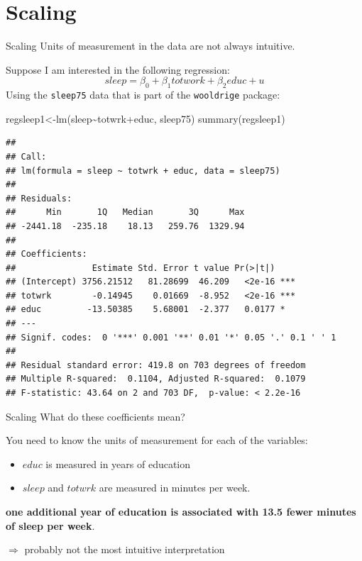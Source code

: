 \documentclass[
  ignorenonframetext,
]{beamer}
\newenvironment{Shaded}{\begin{snugshade}}{\end{snugshade}}
\newcommand{\FunctionTok}[1]{\textcolor[rgb]{0.00,0.00,0.00}{#1}}
\newcommand{\NormalTok}[1]{#1}
\newcommand{\OtherTok}[1]{\textcolor[rgb]{0.56,0.35,0.01}{#1}}
\newcommand{\SpecialCharTok}[1]{\textcolor[rgb]{0.00,0.00,0.00}{#1}}
\begin{document}
\hypertarget{scaling}{%
\section{Scaling}\label{scaling}}

\begin{frame}[fragile]{Scaling}
\protect\hypertarget{scaling-1}{}
Units of measurement in the data are not always intuitive.

Suppose I am interested in the following regression: \[
sleep=\beta_0+\beta_1totwork+\beta_2educ+u
\] Using the \texttt{sleep75} data that is part of the
\texttt{wooldrige} package:

\tiny

\begin{Shaded}
\begin{Highlighting}[]
\NormalTok{regsleep1}\OtherTok{\textless{}{-}}\FunctionTok{lm}\NormalTok{(sleep}\SpecialCharTok{\textasciitilde{}}\NormalTok{totwrk}\SpecialCharTok{+}\NormalTok{educ, sleep75)}
\FunctionTok{summary}\NormalTok{(regsleep1)}
\end{Highlighting}
\end{Shaded}

\begin{verbatim}
## 
## Call:
## lm(formula = sleep ~ totwrk + educ, data = sleep75)
## 
## Residuals:
##      Min       1Q   Median       3Q      Max 
## -2441.18  -235.18    18.13   259.76  1329.94 
## 
## Coefficients:
##               Estimate Std. Error t value Pr(>|t|)    
## (Intercept) 3756.21512   81.28699  46.209   <2e-16 ***
## totwrk        -0.14945    0.01669  -8.952   <2e-16 ***
## educ         -13.50385    5.68001  -2.377   0.0177 *  
## ---
## Signif. codes:  0 '***' 0.001 '**' 0.01 '*' 0.05 '.' 0.1 ' ' 1
## 
## Residual standard error: 419.8 on 703 degrees of freedom
## Multiple R-squared:  0.1104, Adjusted R-squared:  0.1079 
## F-statistic: 43.64 on 2 and 703 DF,  p-value: < 2.2e-16
\end{verbatim}
\end{frame}

\begin{frame}{Scaling}
\protect\hypertarget{scaling-2}{}
What do these coefficients mean?

You need to know the units of measurement for each of the variables:

\begin{itemize}
\item
  \(educ\) is measured in years of education
\item
  \(sleep\) and \(totwrk\) are measured in minutes per week.
\end{itemize}

\textbf{one additional year of education is associated with 13.5 fewer
minutes of sleep per week}.

\(\Rightarrow\) probably not the most intuitive interpretation
\end{frame}
\end{document}
